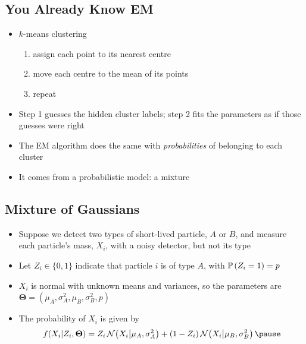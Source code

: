 \Outline %

\begin{slide}
\section{You Already Know EM}

\begin{PauseHighLight}
  \begin{itemize}
  \item $k$-means clustering
    \begin{enumerate}
    \item assign each point to its nearest centre\pause
    \item move each centre to the mean of its points\pause
    \item repeat\pause
    \end{enumerate}
  \item Step 1 guesses the hidden cluster labels; step 2 fits the
    parameters as if those guesses were right\pause
  \item The EM algorithm does the same with \emph{probabilities} of
    belonging to each cluster\pause
  \item It comes from a probabilistic model: a mixture\pause
  \end{itemize}
\end{PauseHighLight}

\end{slide}


\begin{slide}
\section{Mixture of Gaussians}

\begin{PauseHighLight}
  \begin{itemize}
  \item Suppose we detect two types of short-lived particle, $A$ or
    $B$, and measure each particle's mass, $X_i$, with a noisy
    detector, but not its type\pause
  \item Let $Z_i\in\{0,1\}$ indicate that particle $i$ is of type $A$,
    with $\mathbb{P}\left( Z_i=1 \right)=p$\pause
  \item $X_i$ is normal with unknown means and variances, so the
    parameters are $\bm{\Theta} = (\mu_A, \sigma_A^2, \mu_B, \sigma_B^2, p)$\pause
  \item The probability of $X_i$ is given by
    \begin{align*}
      f(X_i|Z_i,\bm{\Theta}) = Z_i\,\normal{X_i\big|\mu_A,\sigma_A^2} +
      (1-Z_i)\,\normal{X_i\big|\mu_B,\sigma_B^2}\pause
    \end{align*}
  \end{itemize}
\end{PauseHighLight}

\end{slide}

